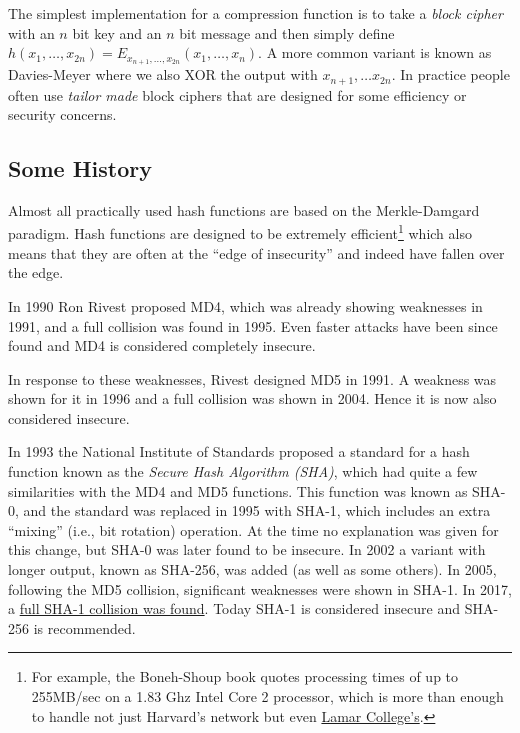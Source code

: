 The simplest implementation for a compression function is to take a
\emph{block cipher} with an \(n\) bit key and an \(n\) bit message and
then simply define
\(h(x_1,\ldots,x_{2n})=E_{x_{n+1},\ldots,x_{2n}}(x_{1},\ldots,x_{n})\).
A more common variant is known as Davies-Meyer where we also XOR the
output with \(x_{n+1},\ldots x_{2n}\). In practice people often use
\emph{tailor made} block ciphers that are designed for some efficiency
or security concerns.

\subsection{Some History}\label{7-Some-History}

Almost all practically used hash functions are based on the
Merkle-Damgard paradigm. Hash functions are designed to be extremely
efficient\footnote{For example, the Boneh-Shoup book quotes processing
  times of up to 255MB/sec on a 1.83 Ghz Intel Core 2 processor, which
  is more than enough to handle not just Harvard's network but even
  \href{http://www.huffingtonpost.com/2014/06/27/colleges-fastest-internet-speed-infographic_n_5536834.html}{Lamar
  College's}.} which also means that they are often at the ``edge of
insecurity'' and indeed have fallen over the edge.

In 1990 Ron Rivest proposed MD4, which was already showing weaknesses in
1991, and a full collision was found in 1995. Even faster attacks have
been since found and MD4 is considered completely insecure.

In response to these weaknesses, Rivest designed MD5 in 1991. A weakness
was shown for it in 1996 and a full collision was shown in 2004. Hence
it is now also considered insecure.

In 1993 the National Institute of Standards proposed a standard for a
hash function known as the \emph{Secure Hash Algorithm (SHA)}, which had
quite a few similarities with the MD4 and MD5 functions. This function
was known as SHA-0, and the standard was replaced in 1995 with SHA-1,
which includes an extra ``mixing'' (i.e., bit rotation) operation. At
the time no explanation was given for this change, but SHA-0 was later
found to be insecure. In 2002 a variant with longer output, known as
SHA-256, was added (as well as some others). In 2005, following the MD5
collision, significant weaknesses were shown in SHA-1. In 2017, a
\href{https://goo.gl/jdqUX9}{full SHA-1 collision was found}. Today
SHA-1 is considered insecure and SHA-256 is recommended.

